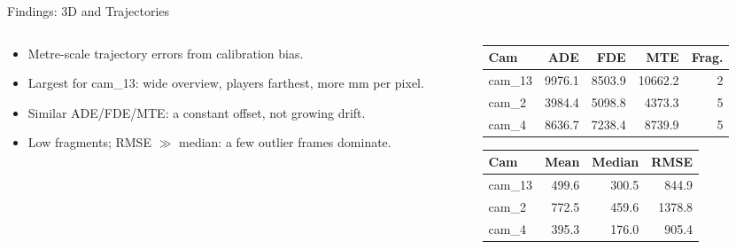 \begin{frame}{Findings: 3D and Trajectories}
\begin{columns}[T]
  \begin{column}{0.52\textwidth}
    \begin{itemize}
      \item Metre-scale trajectory errors from calibration bias.
      \item Largest for cam\_13: wide overview, players farthest, more mm per pixel.
      \item Similar ADE/FDE/MTE: a constant offset, not growing drift.
      \item Low fragments; RMSE $\gg$ median: a few outlier frames dominate.
    \end{itemize}
  \end{column}
  \begin{column}{0.46\textwidth}
    \centering
    \scriptsize
    \begin{tabular}{lrrrr}
      \toprule
      Cam & ADE & FDE & MTE & Frag. \\
      \midrule
      cam\_13 &  9976.1 &  8503.9 & 10662.2 & 2 \\
      cam\_2  &  3984.4 &  5098.8 &  4373.3 & 5 \\
      cam\_4  &  8636.7 &  7238.4 &  8739.9 & 5 \\
      \bottomrule
    \end{tabular}

    \vspace{2em}

    \begin{tabular}{lrrr}
      \toprule
      Cam & Mean & Median & RMSE \\
      \midrule
      cam\_13 & 499.6 & 300.5 &  844.9 \\
      cam\_2  & 772.5 & 459.6 & 1378.8 \\
      cam\_4  & 395.3 & 176.0 &  905.4 \\
      \bottomrule
    \end{tabular}
  \end{column}
\end{columns}
\end{frame}
